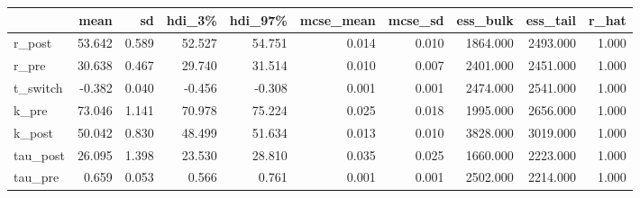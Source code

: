 \begin{tabular}{lrrrrrrrrr}
\toprule
 & mean & sd & hdi\_3\% & hdi\_97\% & mcse\_mean & mcse\_sd & ess\_bulk & ess\_tail & r\_hat \\
\midrule
r\_post & 53.642 & 0.589 & 52.527 & 54.751 & 0.014 & 0.010 & 1864.000 & 2493.000 & 1.000 \\
r\_pre & 30.638 & 0.467 & 29.740 & 31.514 & 0.010 & 0.007 & 2401.000 & 2451.000 & 1.000 \\
t\_switch & -0.382 & 0.040 & -0.456 & -0.308 & 0.001 & 0.001 & 2474.000 & 2541.000 & 1.000 \\
k\_pre & 73.046 & 1.141 & 70.978 & 75.224 & 0.025 & 0.018 & 1995.000 & 2656.000 & 1.000 \\
k\_post & 50.042 & 0.830 & 48.499 & 51.634 & 0.013 & 0.010 & 3828.000 & 3019.000 & 1.000 \\
tau\_post & 26.095 & 1.398 & 23.530 & 28.810 & 0.035 & 0.025 & 1660.000 & 2223.000 & 1.000 \\
tau\_pre & 0.659 & 0.053 & 0.566 & 0.761 & 0.001 & 0.001 & 2502.000 & 2214.000 & 1.000 \\
\bottomrule
\end{tabular}
